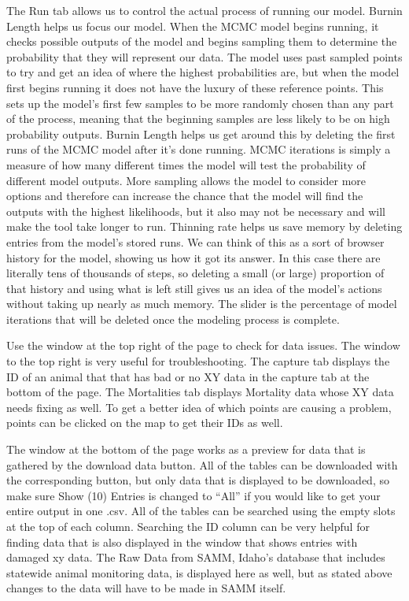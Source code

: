 \documentclass[
]{book}
\begin{document}
The Run tab allows us to control the actual process of running our model. Burnin Length helps us focus our model. When the MCMC model begins running, it checks possible outputs of the model and begins sampling them to determine the probability that they will represent our data. The model uses past sampled points to try and get an idea of where the highest probabilities are, but when the model first begins running it does not have the luxury of these reference points. This sets up the model's first few samples to be more randomly chosen than any part of the process, meaning that the beginning samples are less likely to be on high probability outputs. Burnin Length helps us get around this by deleting the first runs of the MCMC model after it's done running. MCMC iterations is simply a measure of how many different times the model will test the probability of different model outputs. More sampling allows the model to consider more options and therefore can increase the chance that the model will find the outputs with the highest likelihoods, but it also may not be necessary and will make the tool take longer to run. Thinning rate helps us save memory by deleting entries from the model's stored runs. We can think of this as a sort of browser history for the model, showing us how it got its answer. In this case there are literally tens of thousands of steps, so deleting a small (or large) proportion of that history and using what is left still gives us an idea of the model's actions without taking up nearly as much memory. The slider is the percentage of model iterations that will be deleted once the modeling process is complete.

Use the window at the top right of the page to check for data issues. The window to the top right is very useful for troubleshooting. The capture tab displays the ID of an animal that that has bad or no XY data in the capture tab at the bottom of the page. The Mortalities tab displays Mortality data whose XY data needs fixing as well. To get a better idea of which points are causing a problem, points can be clicked on the map to get their IDs as well.

The window at the bottom of the page works as a preview for data that is gathered by the download data button. All of the tables can be downloaded with the corresponding button, but only data that is displayed to be downloaded, so make sure {Show (10) Entries} is changed to ``All'' if you would like to get your entire output in one .csv. All of the tables can be searched using the empty slots at the top of each column. Searching the ID column can be very helpful for finding data that is also displayed in the window that shows entries with damaged xy data. The Raw Data from SAMM, Idaho's database that includes statewide animal monitoring data, is displayed here as well, but as stated above changes to the data will have to be made in SAMM itself.
\end{document}
